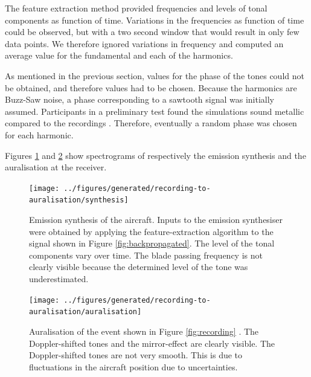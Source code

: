 The feature extraction method provided frequencies and levels of tonal
components as function of time. Variations in the frequencies as function of
time could be observed, but with a two second window that would result in only
few data points. We therefore ignored variations in frequency and computed an
average value for the fundamental and each of the harmonics.

As mentioned in the previous section, values for the phase of the tones could not be obtained, and therefore values had to be chosen.
Because the harmonics are Buzz-Saw noise, a phase corresponding to a sawtooth
signal was initially assumed. Participants in a preliminary test found the simulations
sound metallic compared to the recordings \cite{Rietdijk2016a}. Therefore, eventually a random phase
was chosen for each harmonic.

Figures \ref{fig:synthesis} and \ref{fig:auralisation} show spectrograms of respectively the emission synthesis and the auralisation at the receiver.

\begin{figure}[H]
  \centering
  \texttt{[image: ../figures/generated/recording-to-auralisation/synthesis]}
  \caption{Emission synthesis of the aircraft. Inputs to the emission synthesiser were obtained by applying the feature-extraction algorithm to the signal shown in Figure \ref{fig:backpropagated}. The level of the tonal components vary over time. The blade passing frequency is not clearly visible because the determined level of the tone was underestimated.}
  \label{fig:synthesis}
\end{figure}


\begin{figure}[H]
  \centering
  \texttt{[image: ../figures/generated/recording-to-auralisation/auralisation]}
  \caption{Auralisation of the event shown in Figure \ref{fig:recording} .
  The Doppler-shifted tones and the mirror-effect are clearly visible. The Doppler-shifted tones are not very smooth. This is due to fluctuations in the aircraft position due to uncertainties.}
  \label{fig:auralisation}
\end{figure}



